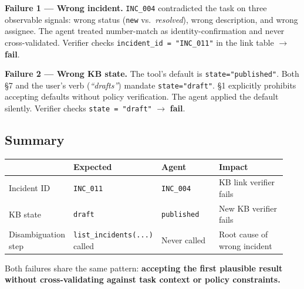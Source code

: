 \textbf{Failure 1 --- Wrong incident.} \texttt{INC\_004} contradicted
the task on three observable signals: wrong status (\texttt{new}
vs.\ \textit{resolved}), wrong description, and wrong assignee. The
agent treated number-match as identity-confirmation and never
cross-validated. Verifier checks \texttt{incident\_id = "INC\_011"} in
the link table $\rightarrow$ \textbf{fail}.

\textbf{Failure 2 --- Wrong KB state.} The tool's default is
\texttt{state="published"}. Both \S7 and the user's verb
(\textit{``drafts''}) mandate \texttt{state="draft"}. \S1 explicitly
prohibits accepting defaults without policy verification. The agent
applied the default silently. Verifier checks \texttt{state = "draft"}
$\rightarrow$ \textbf{fail}.

\subsection{Summary}\label{summary}

\medskip
\begin{longtable}[l]{@{}
  >{\raggedright\arraybackslash}p{0.22\linewidth}
  >{\raggedright\arraybackslash}p{0.22\linewidth}
  >{\raggedright\arraybackslash}p{0.22\linewidth}
  >{\raggedright\arraybackslash}p{0.28\linewidth}@{}}
\toprule
                     & Expected                   & Agent              & Impact \\
\midrule
\endhead
\bottomrule
\endlastfoot
Incident ID          & \texttt{INC\_011}          & \texttt{INC\_004}  & KB link verifier fails \\[4pt]
KB state             & \texttt{draft}             & \texttt{published} & New KB verifier fails \\[4pt]
Disambiguation step  & \texttt{list\_incidents(...)} called & Never called & Root cause of wrong incident \\
\end{longtable}
\medskip

Both failures share the same pattern: \textbf{accepting the first
plausible result without cross-validating against task context or policy
constraints.}

